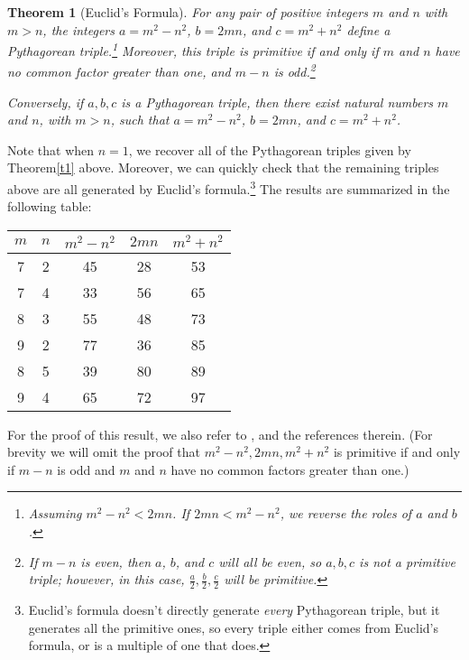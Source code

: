 \documentclass[letterpaper,12pt]{article}
\newtheorem{theorem}{Theorem}
\theoremstyle{definition}
\begin{document}
\begin{theorem}[Euclid's Formula]
 For any pair of positive integers $m$ and $n$ with $m>n$, the integers $a=m^2-n^2$, $b=2mn$, and $c=m^2+n^2$ define a Pythagorean triple.\footnote{Assuming $m^2-n^2<2mn$. If $2mn<m^2-n^2$, we reverse the roles of $a$ and $b$.} Moreover, this triple is primitive if and only if $m$ and $n$ have no common factor greater than one, and $m-n$ is odd.\footnote{If $m-n$ is even, then $a$, $b$, and $c$ will all be even, so $a,b,c$ is not a primitive triple; however, in this case, $\frac{a}{2},\frac{b}{2},\frac{c}{2}$ will be primitive.}

 Conversely, if $a,b,c$ is a Pythagorean triple, then there exist natural numbers $m$ and $n$, with $m>n$, such that $a=m^2-n^2$, $b=2mn$, and $c=m^2+n^2$.
\end{theorem}
Note that when $n=1$, we recover all of the Pythagorean triples given by Theorem\ref{t1} above. Moreover, we can quickly check that the remaining triples above are all generated by Euclid's formula.\footnote{Euclid's formula doesn't directly generate \textit{every} Pythagorean triple, but it generates all the primitive ones, so every triple either comes from Euclid's formula, or is a multiple of one that does.} The results are summarized in the following table:
\begin{center}
 \begin{tabular}{|cc|ccc|}
  \hline
 $m$ & $n$ & $m^2-n^2$ & $2mn$ & $m^2+n^2$\\
\hline
 7 & 2 & 45 & 28 & 53\\
 7 & 4 & 33 & 56 & 65\\
 8 & 3 & 55 & 48 & 73\\
 9 & 2 & 77 & 36 & 85\\
 8 & 5 & 39 & 80 & 89\\
 9 & 4 & 65 & 72 & 97\\
\hline
 \end{tabular}
\end{center}
For the proof of this result, we also refer to \cite{WP}, and the references therein. (For brevity we will omit the proof that $m^2-n^2, 2mn, m^2+n^2$ is primitive if and only if $m-n$ is odd and $m$ and $n$ have no common factors greater than one.)
\end{document}

